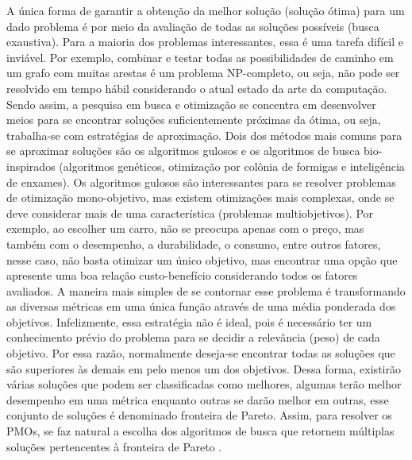 A única forma de garantir a obtenção da melhor solução (solução ótima) para um dado problema é por meio da avaliação de todas as soluções possíveis (busca exaustiva). Para a maioria dos problemas interessantes, essa é uma tarefa difícil e inviável. Por exemplo, combinar e testar todas as possibilidades de caminho em um grafo com muitas arestas é um problema NP-completo, ou seja, não pode ser resolvido em tempo hábil considerando o atual estado da arte da computação. Sendo assim, a pesquisa em busca e otimização se concentra em desenvolver meios para se encontrar soluções suficientemente próximas da ótima, ou seja, trabalha-se com estratégias de aproximação. Dois dos métodos mais comuns para se aproximar soluções são os algoritmos gulosos e os algoritmos de busca bio-inspirados (algoritmos genéticos, otimização por colônia de formigas e inteligência de enxames). Os algoritmos gulosos são interessantes para se resolver problemas de otimização mono-objetivo, mas existem otimizações mais complexas, onde se deve considerar mais de uma característica (problemas multiobjetivos). Por exemplo, ao escolher um carro, não se preocupa apenas com o preço, mas também com o desempenho, a durabilidade, o consumo, entre outros fatores, nesse caso, não basta otimizar um único objetivo, mas encontrar uma opção que apresente uma boa relação custo-benefício considerando todos os fatores avaliados. A maneira mais simples de se contornar esse problema é transformando as diversas métricas em uma única função através de uma média ponderada dos objetivos. Infelizmente, essa estratégia não é ideal, pois é necessário ter um conhecimento prévio do problema para se decidir a relevância (peso) de cada objetivo. Por essa razão, normalmente deseja-se encontrar todas as soluções que são superiores às demais em pelo menos um dos objetivos. Dessa forma, existirão várias soluções que podem ser classificadas como melhores, algumas terão melhor desempenho em uma métrica enquanto outras se darão melhor em outras, esse conjunto de soluções é denominado fronteira de Pareto. Assim, para resolver os \acp{PMO}, se faz natural a escolha dos algoritmos de busca que retornem múltiplas soluções pertencentes à fronteira de Pareto \cite{Srinivas1994}.


